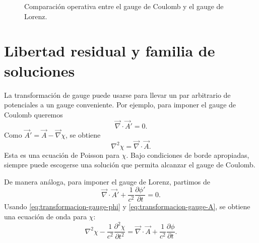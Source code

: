 \documentclass[../main.tex]{subfiles}
\begin{document}
\begin{figure}[ht!]
\centering
{}
\caption{Comparación operativa entre el gauge de Coulomb y el gauge de Lorenz.}
\label{fig:coulomb-lorenz}
\end{figure}

\section{Libertad residual y familia de soluciones}

La transformación de gauge puede usarse para llevar un par arbitrario de potenciales a un gauge conveniente. Por ejemplo, para imponer el gauge de Coulomb queremos
\begin{equation*}
    \vec\nabla\cdot\vec A'=0.
\end{equation*}
Como $\vec A'=\vec A-\vec\nabla\chi$, se obtiene
\begin{equation}
    \nabla^2\chi=\vec\nabla\cdot\vec A.
    \label{eq:poisson-chi-coulomb}
\end{equation}
Esta es una ecuación de Poisson para $\chi$. Bajo condiciones de borde apropiadas, siempre puede escogerse una solución que permita alcanzar el gauge de Coulomb.

De manera análoga, para imponer el gauge de Lorenz, partimos de
\begin{equation*}
    \vec\nabla\cdot\vec A'+\frac{1}{c^2}\frac{\partial\phi'}{\partial t}=0.
\end{equation*}
Usando \eqref{eq:transformacion-gauge-phi} y \eqref{eq:transformacion-gauge-A}, se obtiene una ecuación de onda para $\chi$:
\begin{equation}
    \nabla^2\chi-\frac{1}{c^2}\frac{\partial^2\chi}{\partial t^2}
    =\vec\nabla\cdot\vec A+\frac{1}{c^2}\frac{\partial\phi}{\partial t}.
    \label{eq:onda-chi-lorenz}
\end{equation}
\end{document}

